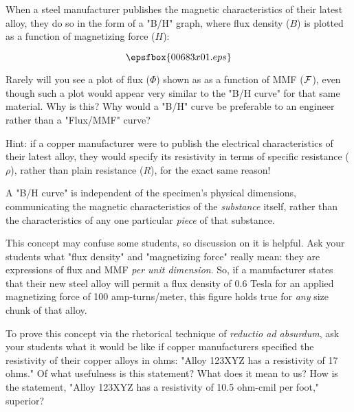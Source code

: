 

When a steel manufacturer publishes the magnetic characteristics of their latest alloy, they do so in the form of a "B/H" graph, where flux density ($B$) is plotted as a function of magnetizing force ($H$):

$$\epsfbox{00683x01.eps}$$

Rarely will you see a plot of flux ($\Phi$) shown as as a function of MMF (${\cal F}$), even though such a plot would appear very similar to the "B/H curve" for that same material.  Why is this?  Why would a "B/H" curve be preferable to an engineer rather than a "Flux/MMF" curve? 

\vskip 10pt

Hint: if a copper manufacturer were to publish the electrical characteristics of their latest alloy, they would specify its resistivity in terms of specific resistance ($\rho$), rather than plain resistance ($R$), for the exact same reason!







A "B/H curve" is independent of the specimen's physical dimensions, communicating the magnetic characteristics of the {\it substance} itself, rather than the characteristics of any one particular {\it piece} of that substance.  







This concept may confuse some students, so discussion on it is helpful.  Ask your students what "flux density" and "magnetizing force" really mean: they are expressions of flux and MMF {\it per unit dimension}.  So, if a manufacturer states that their new steel alloy will permit a flux density of 0.6 Tesla for an applied magnetizing force of 100 amp-turns/meter, this figure holds true for {\it any} size chunk of that alloy.

To prove this concept via the rhetorical technique of {\it reductio ad absurdum}, ask your students what it would be like if copper manufacturers specified the resistivity of their copper alloys in ohms: "Alloy 123XYZ has a resistivity of 17 ohms."  Of what usefulness is this statement?  What does it mean to us?  How is the statement, "Alloy 123XYZ has a resistivity of 10.5 ohm-cmil per foot," superior?




